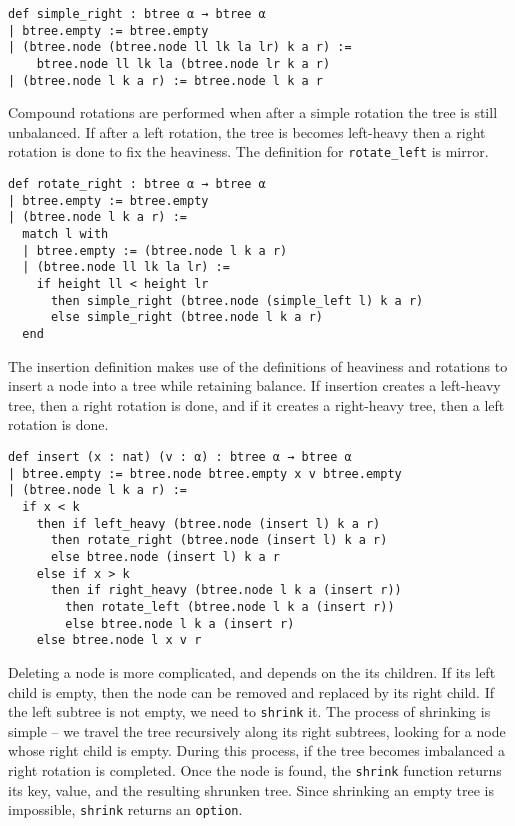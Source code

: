 \begin{lstlisting}
def simple_right : btree α → btree α
| btree.empty := btree.empty
| (btree.node (btree.node ll lk la lr) k a r) := 
    btree.node ll lk la (btree.node lr k a r)
| (btree.node l k a r) := btree.node l k a r
\end{lstlisting}

Compound rotations are performed when after a simple rotation the tree is still unbalanced. If after a left rotation, the tree is becomes left-heavy then a right rotation is done to fix the heaviness. The definition for \lstinline{rotate_left} is mirror.

\begin{lstlisting}
def rotate_right : btree α → btree α
| btree.empty := btree.empty
| (btree.node l k a r) :=
  match l with
  | btree.empty := (btree.node l k a r)
  | (btree.node ll lk la lr) :=
    if height ll < height lr 
      then simple_right (btree.node (simple_left l) k a r)
      else simple_right (btree.node l k a r)
  end 
\end{lstlisting}

The insertion definition makes use of the definitions of heaviness and rotations to insert a node into a tree while retaining balance. If insertion creates a left-heavy tree, then a right rotation is done, and if it creates a right-heavy tree, then a left rotation is done.

\begin{lstlisting}
def insert (x : nat) (v : α) : btree α → btree α
| btree.empty := btree.node btree.empty x v btree.empty
| (btree.node l k a r) :=
  if x < k 
    then if left_heavy (btree.node (insert l) k a r) 
      then rotate_right (btree.node (insert l) k a r)
      else btree.node (insert l) k a r
    else if x > k 
      then if right_heavy (btree.node l k a (insert r)) 
        then rotate_left (btree.node l k a (insert r))
        else btree.node l k a (insert r)
    else btree.node l x v r
\end{lstlisting}  

Deleting a node is more complicated, and depends on the its children. If its left child is empty, then the node can be removed and replaced by its right child. If the left subtree is not empty, we need to \lstinline{shrink} it. The process of shrinking is simple -- we travel the tree recursively along its right subtrees, looking for a node whose right child is empty. During this process, if the tree becomes imbalanced a right rotation is completed. Once the node is found, the \lstinline{shrink} function returns its key, value, and the resulting shrunken tree. Since shrinking an empty tree is impossible, \lstinline{shrink} returns an \lstinline{option}.

